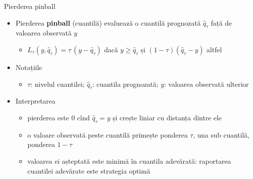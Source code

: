 \begin{frame}{Pierderea pinball}
\itemsize{\small}
\begin{itemize}
    \item Pierderea \textbf{pinball} (cuantilă) evaluează o cuantilă prognozată $\hat q_\tau$ față de valoarea observată $y$
    \begin{itemize}
        \item $L_\tau(y, \hat q_\tau) = \tau\,(y - \hat q_\tau)$ dacă $y \ge \hat q_\tau$ și $(1 - \tau)(\hat q_\tau - y)$ altfel
    \end{itemize}
    \item Notațiile
    \begin{itemize}
        \item $\tau$: nivelul cuantilei; $\hat q_\tau$: cuantila prognozată; $y$: valoarea observată ulterior
    \end{itemize}
    \item Interpretarea
    \begin{itemize}
        \item pierderea este 0 cînd $\hat q_\tau = y$ și crește liniar cu distanța dintre ele
        \item o valoare observată peste cuantilă primește ponderea $\tau$, una sub cuantilă, ponderea $1 - \tau$
        \item valoarea ei așteptată este minimă în cuantila adevărată: raportarea cuantilei adevărate este strategia optimă
    \end{itemize}
\end{itemize}
\end{frame}

